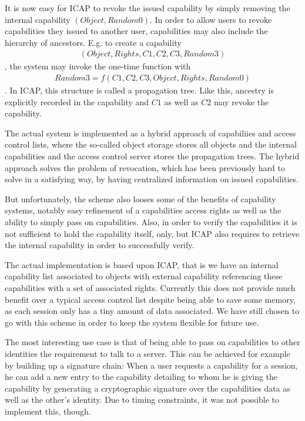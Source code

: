 It is now easy for ICAP to revoke the issued capability by simply removing the internal capability $(Object, Random0)$.
In order to allow users to revoke capabilities they issued to another user, capabilities may also include the hierarchy of ancestors.
E.g. to create a capability
\begin{align*}
    (Object, Rights, C1, C2, C3, Random3)
\end{align*},
the system may invoke the one-time function with
\begin{align*}
    Random3 = f(C1, C2, C3, Object, Rights, Random0)
\end{align*}.
In ICAP, this structure is called a propagation tree.
Like this, ancestry is explicitly recorded in the capability and $C1$ as well as $C2$ may revoke the capability.

The actual system is implemented as a hybrid approach of capabiliies and access control lists, where the so-called object storage stores all objects and the internal capabilities and the access control server stores the propagation trees.
The hybrid approach solves the problem of revocation, which has been previously hard to solve in a satisfying way, by having centralized information on issued capabilities.


But unfortunately, the scheme also looses some of the benefits of capability systems, notably easy refinement of a capabilities access rights as well as the ability to simply pass on capabilities.
Also, in order to verify the capabilities it is not sufficient to hold the capability itself, only, but ICAP also requires to retrieve the internal capability in order to successfully verify.

\bigskip

The actual implementation is based upon ICAP, that is we have an internal capability list associated to objects with external capability referencing these capabilities with a set of associated rights.
Currently this does not provide much benefit over a typical access control list despite being able to save some memory, as each session only has a tiny amount of data associated.
We have still chosen to go with this scheme in order to keep the system flexible for future use.

The most interesting use case is that of being able to pass on capabilities to other identities the requirement to talk to a server.
This can be achieved for example by building up a signature chain:
When a user requests a capability for a session, he can add a new entry to the capability detailing to whom he is giving the capability by generating a cryptographic signature over the capabilities data as well as the other's identity.
Due to timing constraints, it was not possible to implement this, though.

